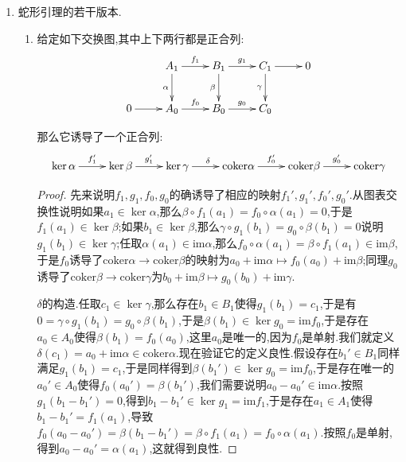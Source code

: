 \begin{enumerate}
\begin{proof}
    	3推1和3推2.考虑如下短正合列之间的同构.构造$h:A_2\to B$为$\varphi\iota_2\beta^{-1}$,那么有$g\circ h=g\circ\varphi\iota_2\circ\beta^{-1}=\beta\circ\pi_2\circ\iota_2\circ\beta^{-1}=1_{A_2}$.构造$h:B\to A_1$为$\alpha\circ\pi_1\circ\varphi^{-1}$,那么有$h\circ f=\alpha\circ\pi_1\circ\varphi^{-1}\circ f=\alpha^{-1}\circ\pi_1\circ\iota_1\circ\alpha^{-1}=1_{A_1}$.
    	$$\xymatrix{
    		0\ar[r]&A_1\ar[r]^{l_1}\ar[d]_{\alpha}&A_1\oplus A_2\ar[r]^{\pi_2}\ar[d]_{\varphi}&A_2\ar[r]\ar[d]^{\beta}&0\\
    		0\ar[r]&A_1\ar[r]_{f}&B\ar[r]_{g}&A_2\ar[r]&0}$$
    \end{proof}
    \item 蛇形引理的若干版本.
    \begin{enumerate}
    	\item 给定如下交换图,其中上下两行都是正合列:
    	$$\xymatrix{
    		& A_1 \ar[d]_{\alpha} \ar[r]^{f_1} & B_1 \ar[d]_{\beta} \ar[r]^{g_1} & C_1 \ar[d]_{\gamma} \ar[r] & 0 \\
    		0 \ar[r] & A_0 \ar[r]^{f_0} & B_0 \ar[r]^{g_0} & C_0 &  }$$
    	
    	那么它诱导了一个正合列:
    	$$\xymatrix{
    		\ker\alpha\ar[r]^{f_1'}&\ker\beta\ar[r]^{g_1'}&\ker\gamma\ar[r]^{\delta}&
    		\mathrm{coker}\alpha\ar[r]^{f_0'}&\mathrm{coker}\beta\ar[r]^{g_0'}&\mathrm{coker}\gamma}$$
    	\begin{proof}
    		
    		先来说明$f_1,g_1,f_0,g_0$的确诱导了相应的映射$f_1',g_1',f_0',g_0'$.从图表交换性说明如果$a_1\in\ker\alpha$,那么$\beta\circ f_1(a_1)=f_0\circ\alpha(a_1)=0$,于是$f_1(a_1)\in\ker\beta$;如果$b_1\in\ker\beta$,那么$\gamma\circ g_1(b_1)=g_0\circ\beta(b_1)=0$说明$g_1(b_1)\in\ker\gamma$;任取$\alpha(a_1)\in\mathrm{im}\alpha$,那么$f_0\circ\alpha(a_1)=\beta\circ f_1(a_1)\in\mathrm{im}\beta$,于是$f_0$诱导了$\mathrm{coker}\alpha\to\mathrm{coker}\beta$的映射为$a_0+\mathrm{im}\alpha\mapsto f_0(a_0)+\mathrm{im}\beta$;同理$g_0$诱导了$\mathrm{coker}\beta\to\mathrm{coker}\gamma$为$b_0+\mathrm{im}\beta\mapsto g_0(b_0)+\mathrm{im}\gamma$.
    		
    		$\delta$的构造.任取$c_1\in\ker\gamma$,那么存在$b_1\in B_1$使得$g_1(b_1)=c_1$,于是有$0=\gamma\circ g_1(b_1)=g_0\circ\beta(b_1)$,于是$\beta(b_1)\in\ker g_0=\mathrm{im}f_0$,于是存在$a_0\in A_0$使得$\beta(b_1)=f_0(a_0)$,这里$a_0$是唯一的,因为$f_0$是单射.我们就定义$\delta(c_1)=a_0+\mathrm{im}\alpha\in\mathrm{coker}\alpha$.现在验证它的定义良性.假设存在$b_1'\in B_1$同样满足$g_1(b_1)=c_1$,于是同样得到$\beta(b_1')\in\ker g_0=\mathrm{im}f_0$,于是存在唯一的$a_0'\in A_0$使得$f_0(a_0')=\beta(b_1')$,我们需要说明$a_0-a_0'\in\mathrm{im}\alpha$.按照$g_1(b_1-b_1')=0$,得到$b_1-b_1'\in\ker g_1=\mathrm{im}f_1$,于是存在$a_1\in A_1$使得$b_1-b_1'=f_1(a_1)$,导致$f_0(a_0-a_0')=\beta(b_1-b_1')=\beta\circ f_1(a_1)=f_0\circ\alpha(a_1)$.按照$f_0$是单射,得到$a_0-a_0'=\alpha(a_1)$,这就得到良性.
    		

\end{proof}
\end{enumerate}
\end{enumerate}
